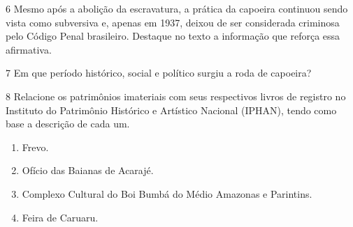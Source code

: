 \num{6} Mesmo após a abolição da escravatura, a prática da capoeira continuou
  sendo vista como subversiva e, apenas em 1937, deixou de ser considerada
  criminosa pelo Código Penal brasileiro. Destaque no texto a informação
  que reforça essa afirmativa.


\num{7} Em que período histórico, social e político surgiu a roda de
  capoeira?


\num{8} Relacione os patrimônios imateriais com seus respectivos livros de
  registro no Instituto do Patrimônio Histórico e Artístico Nacional
  (IPHAN), tendo como base a descrição de cada um.

\begin{enumerate}
\item Frevo.

\item Ofício das Baianas de Acarajé.

\item Complexo Cultural do Boi Bumbá do Médio Amazonas e Parintins.

\item Feira de Caruaru.
\end{enumerate}

